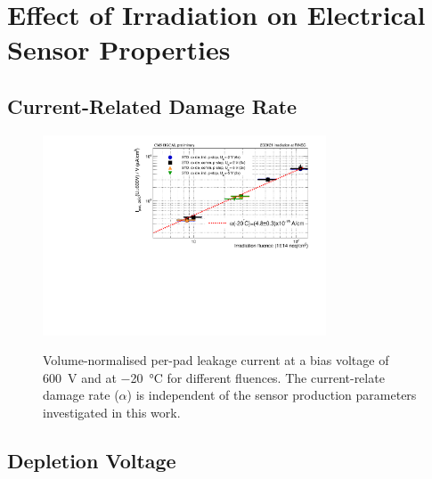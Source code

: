 \section{Effect of Irradiation on Electrical Sensor Properties}
\label{sec:irradiation}

\subsection{Current-Related Damage Rate}
\label{subsec:irradiation_alpha}

\begin{figure}[h]
	\centering
	\includegraphics[width=0.75\textwidth]{plots/alpha/alpha_600V.pdf}
	\label{plot:alpha}
	\caption{
	    Volume-normalised per-pad leakage current at a bias voltage of \SI{600}{\volt} and at \SI{-20}{\celsius} for different fluences.
        The current-relate damage rate ($\alpha$) is independent of the sensor production parameters investigated in this work.
	}
\end{figure}

\subsection{Depletion Voltage}

